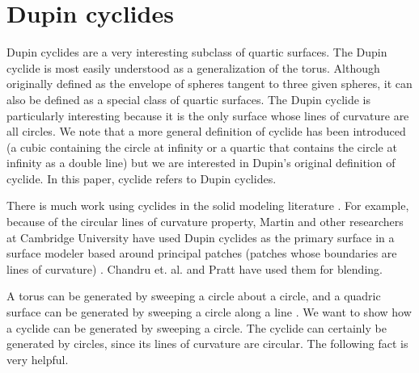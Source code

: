 
\section{Dupin cyclides}
\label{sec-Dupin}


Dupin cyclides are a very interesting subclass of quartic surfaces.
The Dupin cyclide is most easily understood as a generalization
of the torus.
% 
%
Although originally defined as the envelope of spheres tangent to 
three given spheres, it can also be defined as a special class of 
quartic surfaces.
The Dupin cyclide is particularly interesting because it is the only
surface whose lines of curvature are all circles.
We note that a more general definition of cyclide has been introduced
(a cubic containing the circle at infinity or a quartic that contains
the circle at infinity as a double line)
but we are interested in Dupin's original definition of cyclide.
In this paper, cyclide refers to Dupin cyclides.

There is much work using cyclides in the solid modeling literature
\cite{CDH89,DEP84,MAR82,PRA89,SHAR85}.
For example, because of the circular lines of curvature property, 
Martin and other researchers at Cambridge University have used Dupin cyclides
as the primary surface in a surface modeler 
based around principal patches 
(patches whose boundaries are lines of curvature) \cite{DEP84,MAR82,SHAR85}.
Chandru et. al. \cite{CDH89} and Pratt \cite{PRA89} 
have used them for blending.



A torus can be generated by sweeping a circle about a circle, 
and a quadric surface can be generated by sweeping a circle along a line
\cite{JS90a}.
We want to show how a cyclide can be generated by sweeping a circle.
The cyclide can certainly be generated by circles, 
since its lines of curvature are circular.
The following fact is very helpful.

